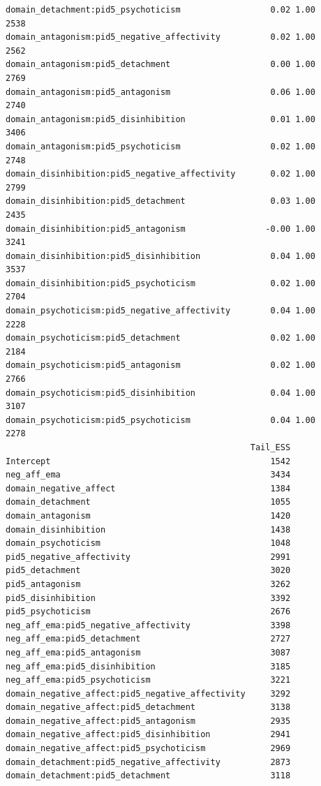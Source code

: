 \documentclass[
  11pt,
  a4paper,
  onecolumn]{article}
\begin{document}
\begin{verbatim}
domain_detachment:pid5_psychoticism                  0.02 1.00     2538
domain_antagonism:pid5_negative_affectivity          0.02 1.00     2562
domain_antagonism:pid5_detachment                    0.00 1.00     2769
domain_antagonism:pid5_antagonism                    0.06 1.00     2740
domain_antagonism:pid5_disinhibition                 0.01 1.00     3406
domain_antagonism:pid5_psychoticism                  0.02 1.00     2748
domain_disinhibition:pid5_negative_affectivity       0.02 1.00     2799
domain_disinhibition:pid5_detachment                 0.03 1.00     2435
domain_disinhibition:pid5_antagonism                -0.00 1.00     3241
domain_disinhibition:pid5_disinhibition              0.04 1.00     3537
domain_disinhibition:pid5_psychoticism               0.02 1.00     2704
domain_psychoticism:pid5_negative_affectivity        0.04 1.00     2228
domain_psychoticism:pid5_detachment                  0.02 1.00     2184
domain_psychoticism:pid5_antagonism                  0.02 1.00     2766
domain_psychoticism:pid5_disinhibition               0.04 1.00     3107
domain_psychoticism:pid5_psychoticism                0.04 1.00     2278
                                                 Tail_ESS
Intercept                                            1542
neg_aff_ema                                          3434
domain_negative_affect                               1384
domain_detachment                                    1055
domain_antagonism                                    1420
domain_disinhibition                                 1438
domain_psychoticism                                  1048
pid5_negative_affectivity                            2991
pid5_detachment                                      3020
pid5_antagonism                                      3262
pid5_disinhibition                                   3392
pid5_psychoticism                                    2676
neg_aff_ema:pid5_negative_affectivity                3398
neg_aff_ema:pid5_detachment                          2727
neg_aff_ema:pid5_antagonism                          3087
neg_aff_ema:pid5_disinhibition                       3185
neg_aff_ema:pid5_psychoticism                        3221
domain_negative_affect:pid5_negative_affectivity     3292
domain_negative_affect:pid5_detachment               3138
domain_negative_affect:pid5_antagonism               2935
domain_negative_affect:pid5_disinhibition            2941
domain_negative_affect:pid5_psychoticism             2969
domain_detachment:pid5_negative_affectivity          2873
domain_detachment:pid5_detachment                    3118

\end{verbatim}
\end{document}
